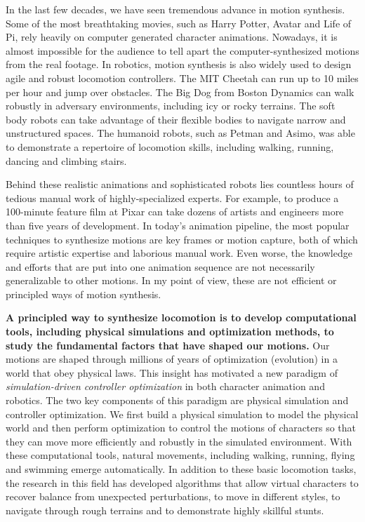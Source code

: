 In the last few decades, we have seen tremendous advance in motion synthesis. Some of the most breathtaking movies, such as Harry Potter, Avatar and Life of Pi, rely heavily on computer generated character animations. Nowadays, it is almost impossible for the audience to tell apart the computer-synthesized motions from the real footage. In robotics, motion synthesis is also widely used to design agile and robust locomotion controllers. The MIT Cheetah can run up to 10 miles per hour and jump over obstacles. The Big Dog from Boston Dynamics can walk robustly in adversary environments, including icy or rocky terrains. The soft body robots can take advantage of their flexible bodies to navigate narrow and unstructured spaces. The humanoid robots, such as Petman and Asimo, was able to demonstrate a repertoire of locomotion skills, including walking, running, dancing and climbing stairs.

Behind these realistic animations and sophisticated robots lies countless hours of tedious manual work of highly-specialized experts. For example, to produce a 100-minute feature film at Pixar can take dozens of artists and engineers more than five years of development. In today's animation pipeline, the most popular techniques to synthesize motions are key frames or motion capture, both of which require artistic expertise and laborious manual work. Even worse, the knowledge and efforts that are put into one animation sequence are not necessarily generalizable to other motions. In my point of view, these are not efficient or principled ways of motion synthesis.

\textbf{A principled way to synthesize locomotion is to develop computational tools, including physical simulations and optimization methods, to study the fundamental factors that have shaped our motions.} Our motions are shaped through millions of years of optimization (evolution) in a world that obey physical laws. This insight has motivated a new paradigm of \emph{simulation-driven controller optimization} in both character animation and robotics. The two key components of this paradigm are physical simulation and controller optimization. We first build a physical simulation to model the physical world and then perform optimization to control the motions of characters so that they can move more efficiently and robustly in the simulated environment. With these computational tools, natural movements, including walking, running, flying and swimming emerge automatically. In addition to these basic locomotion tasks, the research in this field has developed algorithms that allow virtual characters to recover balance from unexpected perturbations, to move in different styles, to navigate through rough terrains and to demonstrate highly skillful stunts.

